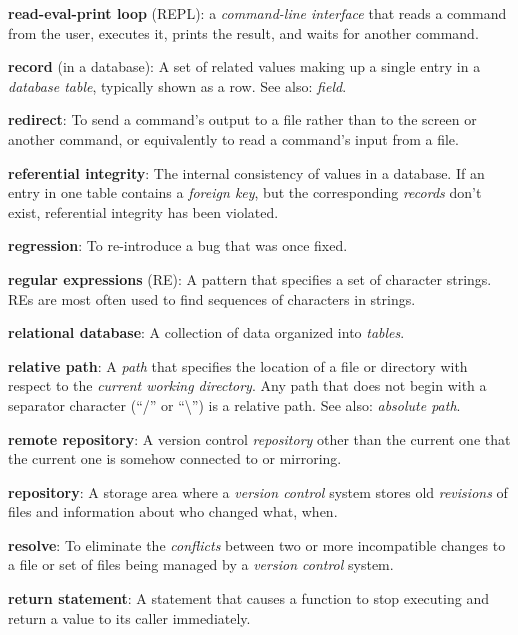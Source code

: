\documentclass[]{book}
\newcommand{\gdef}[2]{\emph{#2}}
\begin{document}
\textbf{read-eval-print loop} (REPL): a \gdef{g:cli}{command-line
interface} that reads a command from the user, executes it, prints the
result, and waits for another command.

\textbf{record} (in a database): A set of related values making up a
single entry in a \gdef{g:table-database}{database table}, typically
shown as a row. See also: \gdef{g:field-database}{field}.

\textbf{redirect}: To send a command's output to a file rather than to
the screen or another command, or equivalently to read a command's input
from a file.

\textbf{referential integrity}: The internal consistency of values in a
database. If an entry in one table contains a
\gdef{g:foreign-key}{foreign key}, but the corresponding
\gdef{g:record-database}{records} don't exist, referential integrity
has been violated.

\textbf{regression}: To re-introduce a bug that was once fixed.

\textbf{regular expressions} (RE): A pattern that specifies a set of
character strings. REs are most often used to find sequences of
characters in strings.

\textbf{relational database}: A collection of data organized into
\gdef{g:table-database}{tables}.

\textbf{relative path}: A \gdef{g:path}{path} that specifies the
location of a file or directory with respect to the
\gdef{g:current-working-directory}{current working directory}. Any
path that does not begin with a separator character (``/'' or
``\textbackslash{}'') is a relative path. See also:
\gdef{g:absolute-path}{absolute path}.

\textbf{remote repository}: A version control
\gdef{g:repository}{repository} other than the current one that the
current one is somehow connected to or mirroring.

\textbf{repository}: A storage area where a
\gdef{g:version-control}{version control} system stores old
\gdef{g:revision}{revisions} of files and information about who
changed what, when.

\textbf{resolve}: To eliminate the \gdef{g:conflict}{conflicts}
between two or more incompatible changes to a file or set of files being
managed by a \gdef{g:version-control}{version control} system.

\textbf{return statement}: A statement that causes a function to stop
executing and return a value to its caller immediately.
\end{document}
